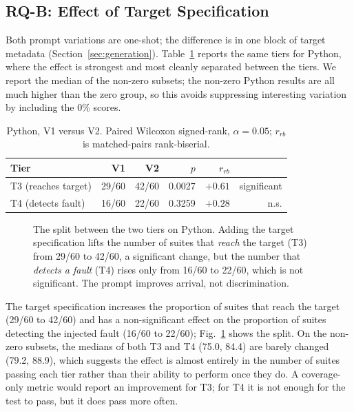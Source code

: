 \subsection{RQ-B: Effect of Target Specification}\label{sec:rqb}

Both prompt variations are one-shot; the difference is in one block of target metadata
(Section~\ref{sec:generation}). Table~\ref{tab:rqb} reports the same tiers for Python, where
the effect is strongest and most cleanly separated between the tiers. We report the median of
the non-zero subsets; the non-zero Python results are all much higher than the zero group, so
this avoids suppressing interesting variation by including the 0\% scores.

\begin{table}[t]
\centering
\caption{Python, V1 versus V2. Paired Wilcoxon signed-rank, $\alpha = 0.05$; $r_{rb}$ is
matched-pairs rank-biserial.}
\label{tab:rqb}
\begin{tabular}{lrrrrr}
\toprule
Tier & V1 & V2 & $p$ & $r_{rb}$ & \\
\midrule
T3 (reaches target) & 29/60 & 42/60 & 0.0027 & $+0.61$ & significant \\
T4 (detects fault)  & 16/60 & 22/60 & 0.3259 & $+0.28$ & n.s. \\
\bottomrule
\end{tabular}
\end{table}

\begin{figure}[t]
\centering

\caption{The split between the two tiers on Python. Adding the target specification lifts the
number of suites that \emph{reach} the target (T3) from 29/60 to 42/60, a significant change,
but the number that \emph{detects a fault} (T4) rises only from 16/60 to 22/60, which is not
significant. The prompt improves arrival, not discrimination.}
\label{fig:rqb}
\end{figure}

The target specification increases the proportion of suites that reach the target
(29/60 to 42/60) and has a non-significant effect on the proportion of suites detecting the
injected fault (16/60 to 22/60); Fig.~\ref{fig:rqb} shows the split. On the non-zero subsets, the medians of both T3 and T4
(75.0, 84.4) are barely changed (79.2, 88.9), which suggests the effect is almost entirely in
the number of suites passing each tier rather than their ability to perform once they do. A
coverage-only metric would report an improvement for T3; for T4 it is not enough for the test
to pass, but it does pass more often.

